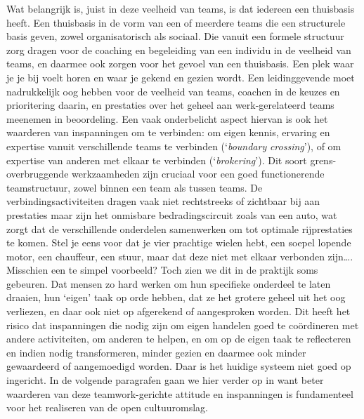 \documentclass[smallauthor, chapterhaspagenum, nochapterinheader, pagenuminheader,  bigchapnum,medium2, tocpages,  garamond, titleinheader]{jote-book}
\begin{document}
	Wat belangrijk is, juist in deze veelheid van teams, is dat iedereen een thuisbasis heeft. Een thuisbasis in de vorm van een of meerdere teams die een structurele basis geven, zowel organisatorisch als sociaal. Die vanuit een formele structuur zorg dragen voor de coaching en begeleiding van een individu in de veelheid van teams, en daarmee ook zorgen voor het gevoel van een thuisbasis. Een plek waar je je bij voelt horen en waar je gekend en gezien wordt. Een leidinggevende moet nadrukkelijk oog hebben voor de veelheid van teams, coachen in de keuzes en prioritering daarin, en prestaties over het geheel aan werk-gerelateerd teams meenemen in beoordeling. Een vaak onderbelicht aspect hiervan is ook het waarderen van inspanningen om te verbinden: om eigen kennis, ervaring en expertise vanuit verschillende teams te verbinden (‘\emph{boundary}\emph{ crossing}'), of om expertise van anderen met elkaar te verbinden (‘\emph{brokering}'). Dit soort grens-overbruggende werkzaamheden zijn cruciaal voor een goed functionerende teamstructuur, zowel binnen een team als tussen teams. De verbindingsactiviteiten dragen vaak niet rechtstreeks of zichtbaar bij aan prestaties maar zijn het onmisbare bedradingscircuit zoals van een auto, wat zorgt dat de verschillende onderdelen samenwerken om tot optimale rijprestaties te komen. Stel je eens voor dat je vier prachtige wielen hebt, een soepel lopende motor, een chauffeur, een stuur, maar dat deze niet met elkaar verbonden zijn…. Misschien een te simpel voorbeeld? Toch zien we dit in de praktijk soms gebeuren. Dat mensen zo hard werken om hun specifieke onderdeel te laten draaien, hun ‘eigen' taak op orde hebben, dat ze het grotere geheel uit het oog verliezen, en daar ook niet op afgerekend of aangesproken worden. Dit heeft het risico dat inspanningen die nodig zijn om eigen handelen goed te coördineren met andere activiteiten, om anderen te helpen, en om op de eigen taak te reflecteren en indien nodig transformeren, minder gezien en daarmee ook minder gewaardeerd of aangemoedigd worden. Daar is het huidige systeem niet goed op ingericht. In de volgende paragrafen gaan we hier verder op in want beter waarderen van deze teamwork-gerichte attitude en inspanningen is fundamenteel voor het realiseren van de open cultuuromslag.
\end{document}
